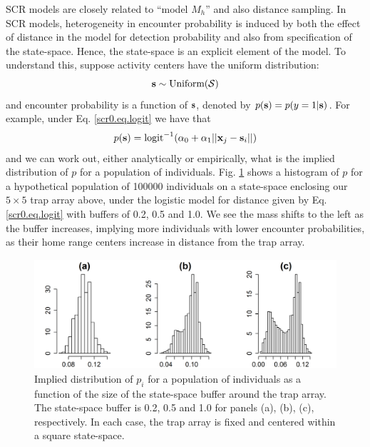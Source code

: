 SCR models are closely related to  ``model
$M_h$'' and also distance sampling.  In SCR models,
heterogeneity in encounter probability is induced by both the effect
of distance in the model for detection probability and also from
specification of the state-space. Hence, the state-space  is an
explicit element of the model.
To understand this, suppose activity centers have the uniform distribution:
\[
{\bf s} \sim \mbox{Uniform}({\cal S})
\]
and encounter probability is a function of ${\bf s}$, denoted by
 $p({\bf s}) = p(y=1|{\bf s})$.
For example, under Eq. \ref{scr0.eq.logit}
we have that
\[
p({\bf s}) = \mbox{logit}^{-1} ( \alpha_{0} + \alpha_1 ||{\bf
  x}_{j}-{\bf s}_{i} || )
\]
and we can work out, either analytically or empirically, what is the
implied distribution of $p$ for a population of individuals.
Fig. \ref{scr0.fig.buffereffect} shows a
histogram of $p$ for a hypothetical population of 100000 individuals
on a state-space enclosing our $5 \times 5$ trap array above, under
the logistic model for distance given by Eq. \ref{scr0.eq.logit}
with
 buffers of 0.2, 0.5
and 1.0. We see the mass shifts to the left as the buffer increases,
implying more individuals with lower encounter probabilities, as their
home range centers increase in distance from the trap array.

\begin{figure}[ht]
\begin{center}
\includegraphics[width=4.5in,height=1.6in]{Ch5-SCR0/figs/Mh_buffer}
\end{center}
\caption{Implied distribution of $p_{i}$ for a population
  of individuals as a function of the size of the state-space buffer
around the trap array. The state-space buffer is 0.2, 0.5 and 1.0 for
panels (a), (b), (c), respectively.
In each case, the trap array is fixed and centered within a
  square state-space.
}
\label{scr0.fig.buffereffect}
\end{figure}

